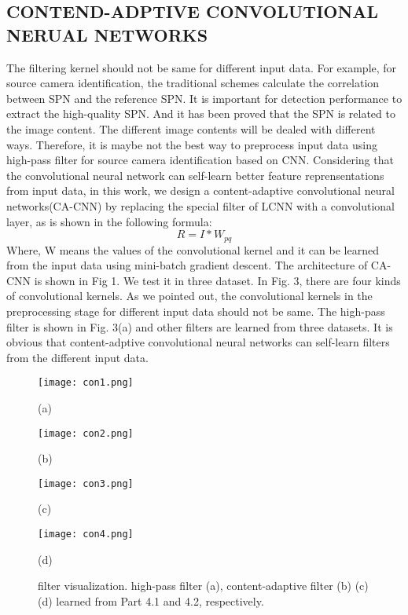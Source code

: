 \documentclass{article}
\begin{document}
\subsection{CONTEND-ADPTIVE CONVOLUTIONAL NERUAL NETWORKS}
The filtering kernel should not be same for different input data. For example, for source camera identification, the traditional schemes calculate the correlation between SPN and the reference SPN. It is important for detection performance to extract the high-quality SPN. And it has been proved that the SPN is related to the image content. The different image contents will be dealed with different ways. Therefore, it is maybe not the best way to preprocess input data using high-pass filter for source camera identification based on CNN. Considering that the convolutional neural network can self-learn better feature reprensentations from input data, in this work, we design a content-adaptive convolutional neural networks(CA-CNN) by replacing the special filter of LCNN with a convolutional layer, as is shown in the following formula:
\begin{equation}\label{key}
R=I*W_{pq}
\end{equation}
Where, W means the values of the convolutional kernel and it can be learned from the input data using mini-batch gradient descent. The architecture of CA-CNN is shown in Fig 1. We test it in three dataset. In Fig. 3, there are four kinds of convolutional kernels. As we pointed out, the convolutional kernels in the preprocessing stage for different input data should not be same. The high-pass filter is shown in Fig. 3(a) and other filters are learned from three datasets. It is obvious that content-adptive convolutional neural networks can self-learn filters from the different input data. 
\begin{figure}
	\begin{minipage}[t]{0.45\linewidth}
	\centering
	\texttt{[image: con1.png]}
	\centerline{(a)}
\end{minipage}
\hfil
\begin{minipage}[t]{0.5\linewidth}
	\centering
	\texttt{[image: con2.png]}
	\centerline{(b)}
\end{minipage}
\begin{minipage}[t]{0.45\linewidth}
	\centering
	\texttt{[image: con3.png]}
	\centerline{(c)}
\end{minipage}
\hfill
\begin{minipage}[t]{0.5\linewidth}
	\centering
	\texttt{[image: con4.png]}
	\centerline{(d)}
\end{minipage}
\caption{filter visualization. high-pass filter (a), content-adaptive filter (b) (c) (d) learned from Part 4.1 and 4.2, respectively.}
\end{figure}
\end{document}
